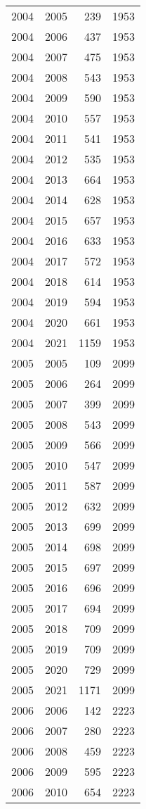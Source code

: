 \documentclass[
  11pt,
  letterpaper,
  DIV=11,
  numbers=noendperiod,
  twoside]{scrartcl}
\begin{document}
\begin{longtable}[]{@{}rrrr@{}}
2004 & 2005 & 239 & 1953 \\
2004 & 2006 & 437 & 1953 \\
2004 & 2007 & 475 & 1953 \\
2004 & 2008 & 543 & 1953 \\
2004 & 2009 & 590 & 1953 \\
2004 & 2010 & 557 & 1953 \\
2004 & 2011 & 541 & 1953 \\
2004 & 2012 & 535 & 1953 \\
2004 & 2013 & 664 & 1953 \\
2004 & 2014 & 628 & 1953 \\
2004 & 2015 & 657 & 1953 \\
2004 & 2016 & 633 & 1953 \\
2004 & 2017 & 572 & 1953 \\
2004 & 2018 & 614 & 1953 \\
2004 & 2019 & 594 & 1953 \\
2004 & 2020 & 661 & 1953 \\
2004 & 2021 & 1159 & 1953 \\
2005 & 2005 & 109 & 2099 \\
2005 & 2006 & 264 & 2099 \\
2005 & 2007 & 399 & 2099 \\
2005 & 2008 & 543 & 2099 \\
2005 & 2009 & 566 & 2099 \\
2005 & 2010 & 547 & 2099 \\
2005 & 2011 & 587 & 2099 \\
2005 & 2012 & 632 & 2099 \\
2005 & 2013 & 699 & 2099 \\
2005 & 2014 & 698 & 2099 \\
2005 & 2015 & 697 & 2099 \\
2005 & 2016 & 696 & 2099 \\
2005 & 2017 & 694 & 2099 \\
2005 & 2018 & 709 & 2099 \\
2005 & 2019 & 709 & 2099 \\
2005 & 2020 & 729 & 2099 \\
2005 & 2021 & 1171 & 2099 \\
2006 & 2006 & 142 & 2223 \\
2006 & 2007 & 280 & 2223 \\
2006 & 2008 & 459 & 2223 \\
2006 & 2009 & 595 & 2223 \\
2006 & 2010 & 654 & 2223 \\

\end{longtable}
\end{document}
